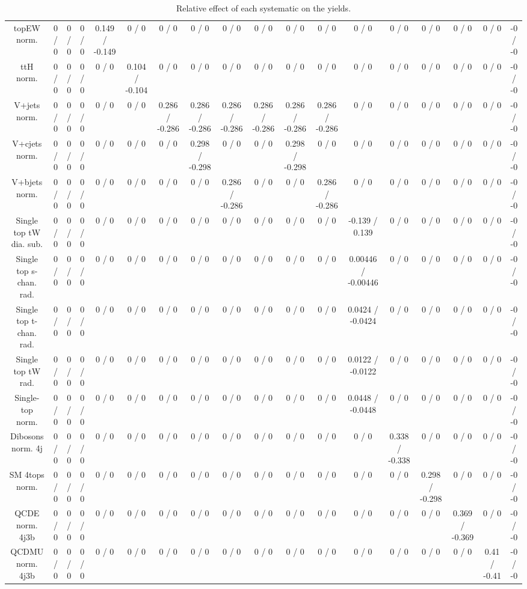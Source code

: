 \documentclass[10pt]{article}
\begin{document}
\begin{table}[htbp]
\begin{center}
\begin{tabular}{|c|c|c|c|c|c|c|c|c|c|c|c|c|c|c|c|c|c|}
  topEW norm. & 0 / 0 & 0 / 0 & 0 / 0 & 0.149 / -0.149 & 0 / 0 & 0 / 0 & 0 / 0 & 0 / 0 & 0 / 0 & 0 / 0 & 0 / 0 & 0 / 0 & 0 / 0 & 0 / 0 & 0 / 0 & 0 / 0 & -0 / -0 \\ 
  ttH norm. & 0 / 0 & 0 / 0 & 0 / 0 & 0 / 0 & 0.104 / -0.104 & 0 / 0 & 0 / 0 & 0 / 0 & 0 / 0 & 0 / 0 & 0 / 0 & 0 / 0 & 0 / 0 & 0 / 0 & 0 / 0 & 0 / 0 & -0 / -0 \\ 
  V+jets norm. & 0 / 0 & 0 / 0 & 0 / 0 & 0 / 0 & 0 / 0 & 0.286 / -0.286 & 0.286 / -0.286 & 0.286 / -0.286 & 0.286 / -0.286 & 0.286 / -0.286 & 0.286 / -0.286 & 0 / 0 & 0 / 0 & 0 / 0 & 0 / 0 & 0 / 0 & -0 / -0 \\ 
  V+cjets norm. & 0 / 0 & 0 / 0 & 0 / 0 & 0 / 0 & 0 / 0 & 0 / 0 & 0.298 / -0.298 & 0 / 0 & 0 / 0 & 0.298 / -0.298 & 0 / 0 & 0 / 0 & 0 / 0 & 0 / 0 & 0 / 0 & 0 / 0 & -0 / -0 \\ 
  V+bjets norm. & 0 / 0 & 0 / 0 & 0 / 0 & 0 / 0 & 0 / 0 & 0 / 0 & 0 / 0 & 0.286 / -0.286 & 0 / 0 & 0 / 0 & 0.286 / -0.286 & 0 / 0 & 0 / 0 & 0 / 0 & 0 / 0 & 0 / 0 & -0 / -0 \\ 
  Single top tW dia. sub. & 0 / 0 & 0 / 0 & 0 / 0 & 0 / 0 & 0 / 0 & 0 / 0 & 0 / 0 & 0 / 0 & 0 / 0 & 0 / 0 & 0 / 0 & -0.139 / 0.139 & 0 / 0 & 0 / 0 & 0 / 0 & 0 / 0 & -0 / -0 \\ 
  Single top s-chan. rad. & 0 / 0 & 0 / 0 & 0 / 0 & 0 / 0 & 0 / 0 & 0 / 0 & 0 / 0 & 0 / 0 & 0 / 0 & 0 / 0 & 0 / 0 & 0.00446 / -0.00446 & 0 / 0 & 0 / 0 & 0 / 0 & 0 / 0 & -0 / -0 \\ 
  Single top t-chan. rad. & 0 / 0 & 0 / 0 & 0 / 0 & 0 / 0 & 0 / 0 & 0 / 0 & 0 / 0 & 0 / 0 & 0 / 0 & 0 / 0 & 0 / 0 & 0.0424 / -0.0424 & 0 / 0 & 0 / 0 & 0 / 0 & 0 / 0 & -0 / -0 \\ 
  Single top tW rad. & 0 / 0 & 0 / 0 & 0 / 0 & 0 / 0 & 0 / 0 & 0 / 0 & 0 / 0 & 0 / 0 & 0 / 0 & 0 / 0 & 0 / 0 & 0.0122 / -0.0122 & 0 / 0 & 0 / 0 & 0 / 0 & 0 / 0 & -0 / -0 \\ 
  Single-top norm. & 0 / 0 & 0 / 0 & 0 / 0 & 0 / 0 & 0 / 0 & 0 / 0 & 0 / 0 & 0 / 0 & 0 / 0 & 0 / 0 & 0 / 0 & 0.0448 / -0.0448 & 0 / 0 & 0 / 0 & 0 / 0 & 0 / 0 & -0 / -0 \\ 
  Dibosons norm. 4j & 0 / 0 & 0 / 0 & 0 / 0 & 0 / 0 & 0 / 0 & 0 / 0 & 0 / 0 & 0 / 0 & 0 / 0 & 0 / 0 & 0 / 0 & 0 / 0 & 0.338 / -0.338 & 0 / 0 & 0 / 0 & 0 / 0 & -0 / -0 \\ 
  SM 4tops norm. & 0 / 0 & 0 / 0 & 0 / 0 & 0 / 0 & 0 / 0 & 0 / 0 & 0 / 0 & 0 / 0 & 0 / 0 & 0 / 0 & 0 / 0 & 0 / 0 & 0 / 0 & 0.298 / -0.298 & 0 / 0 & 0 / 0 & -0 / -0 \\ 
  QCDE norm. 4j3b & 0 / 0 & 0 / 0 & 0 / 0 & 0 / 0 & 0 / 0 & 0 / 0 & 0 / 0 & 0 / 0 & 0 / 0 & 0 / 0 & 0 / 0 & 0 / 0 & 0 / 0 & 0 / 0 & 0.369 / -0.369 & 0 / 0 & -0 / -0 \\ 
  QCDMU norm. 4j3b & 0 / 0 & 0 / 0 & 0 / 0 & 0 / 0 & 0 / 0 & 0 / 0 & 0 / 0 & 0 / 0 & 0 / 0 & 0 / 0 & 0 / 0 & 0 / 0 & 0 / 0 & 0 / 0 & 0 / 0 & 0.41 / -0.41 & -0 / -0 \\ 
\hline 
\end{tabular} 
\caption{Relative effect of each systematic on the yields.} 
\end{center} 
\end{table} 
\end{document}
